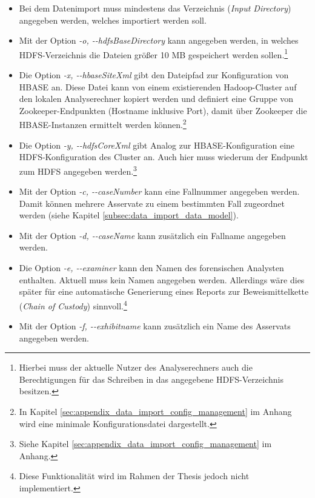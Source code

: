 \begin{itemize}
\item Bei dem Datenimport muss mindestens das Verzeichnis (\textit{Input Directory}) angegeben werden, welches importiert werden soll.
 
\item Mit der Option \textit{-o, -{}-hdfsBaseDirectory} kann angegeben werden, in welches HDFS-Verzeichnis die Dateien größer 10 MB gespeichert werden sollen.\footnote{Hierbei muss der aktuelle Nutzer des Analyserechners auch die Berechtigungen für das Schreiben in das angegebene HDFS-Verzeichnis besitzen.}

\item Die Option \textit{-x, -{}-hbaseSiteXml} gibt den Dateipfad zur Konfiguration von HBASE an. Diese Datei kann von einem existierenden Hadoop-Cluster auf den lokalen Analyserechner kopiert werden und definiert eine Gruppe von Zookeeper-Endpunkten (Hostname inklusive Port), damit über Zookeeper die HBASE-Instanzen ermittelt werden können.\footnote{ In Kapitel \ref{sec:appendix_data_import_config_management} im Anhang wird eine minimale Konfigurationsdatei dargestellt.}

\item Die Option \textit{-y, -{}-hdfsCoreXml} gibt Analog zur HBASE-Konfiguration eine HDFS-Konfiguration des Cluster an. Auch hier muss wiederum der Endpunkt zum HDFS angegeben werden.\footnote{Siehe Kapitel \ref{sec:appendix_data_import_config_management} im Anhang.}

\item Mit der Option \textit{-c, -{}-caseNumber} kann eine Fallnummer angegeben werden. Damit können mehrere Asservate zu einem bestimmten Fall zugeordnet werden (siehe Kapitel \ref{subsec:data_import_data_model}).

\item Mit der Option \textit{-d, -{}-caseName} kann zusätzlich ein Fallname angegeben werden.

\item Die Option \textit{-e, -{}-examiner} kann den Namen des forensischen Analysten enthalten. Aktuell muss kein Namen angegeben werden. Allerdings wäre dies später für eine automatische Generierung eines Reports zur Beweismittelkette (\textit{Chain of Custody}) sinnvoll.\footnote{Diese Funktionalität wird im Rahmen der Thesis jedoch nicht implementiert.}

\item Mit der Option \textit{-f, -{}-exhibitname} kann zusätzlich ein Name des Asservats angegeben werden.

\end{itemize}

